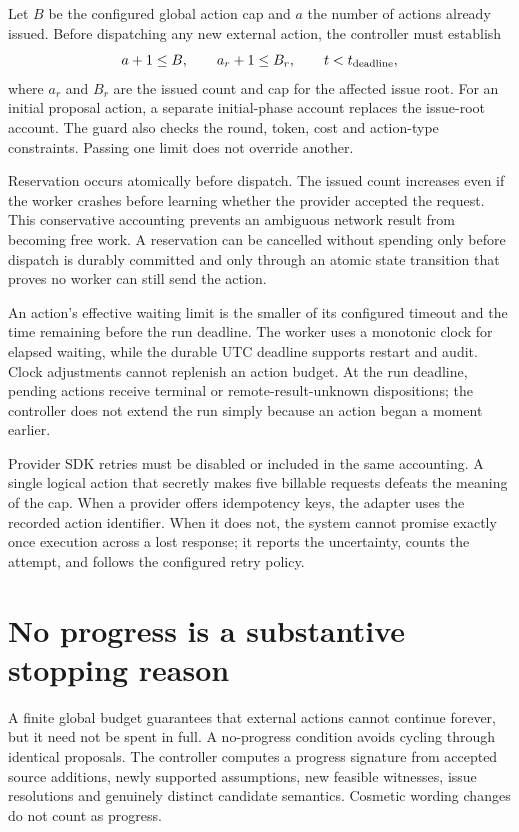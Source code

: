 Let $B$ be the configured global action cap and $a$ the number of actions already
issued. Before dispatching any new external action, the controller must establish
\begin{equation}
 a+1\leq B,\qquad a_r+1\leq B_r,\qquad t<t_{\rm deadline},
 \label{eq:budget-guard}
\end{equation}
where $a_r$ and $B_r$ are the issued count and cap for the affected issue root.
For an initial proposal action, a separate initial-phase account replaces the
issue-root account. The guard also checks the round, token, cost and action-type
constraints. Passing one limit does not override another.

Reservation occurs atomically before dispatch. The issued count increases even if
the worker crashes before learning whether the provider accepted the request.
This conservative accounting prevents an ambiguous network result from becoming
free work. A reservation can be cancelled without spending only before dispatch
is durably committed and only through an atomic state transition that proves no
worker can still send the action.

An action's effective waiting limit is the smaller of its configured timeout
and the time remaining before the run deadline. The worker uses a monotonic clock
for elapsed waiting, while the durable UTC deadline supports restart and audit.
Clock adjustments cannot replenish an action budget. At the run deadline, pending
actions receive terminal or remote-result-unknown dispositions; the controller
does not extend the run simply because an action began a moment earlier.

Provider SDK retries must be disabled or included in the same accounting. A
single logical action that secretly makes five billable requests defeats the
meaning of the cap. When a provider offers idempotency keys, the adapter uses the
recorded action identifier. When it does not, the system cannot promise exactly
once execution across a lost response; it reports the uncertainty, counts the
attempt, and follows the configured retry policy.

\section{No progress is a substantive stopping reason}

A finite global budget guarantees that external actions cannot continue forever,
but it need not be spent in full. A no-progress condition avoids cycling through
identical proposals. The controller computes a progress signature from accepted
source additions, newly supported assumptions, new feasible witnesses, issue
resolutions and genuinely distinct candidate semantics. Cosmetic wording changes
do not count as progress.

